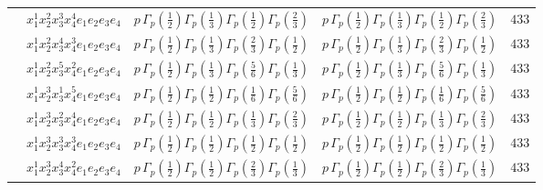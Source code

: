 \documentclass[11pt]{article}
\begin{document}
\begin{table}[ht]
{\begin{tabular}{@{}lllll@{}}
 & $x_{1}^{1} x_{2}^{2} x_{3}^{3} x_{4}^{4}  e_{1} e_{2} e_{3} e_{4}$ & $p \, \Gamma_p \left( \frac{1}{2} \right) \Gamma_p \left( \frac{1}{3} \right) \Gamma_p \left( \frac{1}{2} \right) \Gamma_p \left( \frac{2}{3} \right)$ & $p \, \Gamma_p \left( \frac{1}{2} \right) \Gamma_p \left( \frac{1}{3} \right) \Gamma_p \left( \frac{1}{2} \right) \Gamma_p \left( \frac{2}{3} \right)$ & $433$ \\
 & $x_{1}^{1} x_{2}^{2} x_{3}^{4} x_{4}^{3}  e_{1} e_{2} e_{3} e_{4}$ & $p \, \Gamma_p \left( \frac{1}{2} \right) \Gamma_p \left( \frac{1}{3} \right) \Gamma_p \left( \frac{2}{3} \right) \Gamma_p \left( \frac{1}{2} \right)$ & $p \, \Gamma_p \left( \frac{1}{2} \right) \Gamma_p \left( \frac{1}{3} \right) \Gamma_p \left( \frac{2}{3} \right) \Gamma_p \left( \frac{1}{2} \right)$ & $433$ \\
 & $x_{1}^{1} x_{2}^{2} x_{3}^{5} x_{4}^{2}  e_{1} e_{2} e_{3} e_{4}$ & $p \, \Gamma_p \left( \frac{1}{2} \right) \Gamma_p \left( \frac{1}{3} \right) \Gamma_p \left( \frac{5}{6} \right) \Gamma_p \left( \frac{1}{3} \right)$ & $p \, \Gamma_p \left( \frac{1}{2} \right) \Gamma_p \left( \frac{1}{3} \right) \Gamma_p \left( \frac{5}{6} \right) \Gamma_p \left( \frac{1}{3} \right)$ & $433$ \\
 & $x_{1}^{1} x_{2}^{3} x_{3}^{1} x_{4}^{5}  e_{1} e_{2} e_{3} e_{4}$ & $p \, \Gamma_p \left( \frac{1}{2} \right) \Gamma_p \left( \frac{1}{2} \right) \Gamma_p \left( \frac{1}{6} \right) \Gamma_p \left( \frac{5}{6} \right)$ & $p \, \Gamma_p \left( \frac{1}{2} \right) \Gamma_p \left( \frac{1}{2} \right) \Gamma_p \left( \frac{1}{6} \right) \Gamma_p \left( \frac{5}{6} \right)$ & $433$ \\
 & $x_{1}^{1} x_{2}^{3} x_{3}^{2} x_{4}^{4}  e_{1} e_{2} e_{3} e_{4}$ & $p \, \Gamma_p \left( \frac{1}{2} \right) \Gamma_p \left( \frac{1}{2} \right) \Gamma_p \left( \frac{1}{3} \right) \Gamma_p \left( \frac{2}{3} \right)$ & $p \, \Gamma_p \left( \frac{1}{2} \right) \Gamma_p \left( \frac{1}{2} \right) \Gamma_p \left( \frac{1}{3} \right) \Gamma_p \left( \frac{2}{3} \right)$ & $433$ \\
 & $x_{1}^{1} x_{2}^{3} x_{3}^{3} x_{4}^{3}  e_{1} e_{2} e_{3} e_{4}$ & $p \, \Gamma_p \left( \frac{1}{2} \right) \Gamma_p \left( \frac{1}{2} \right) \Gamma_p \left( \frac{1}{2} \right) \Gamma_p \left( \frac{1}{2} \right)$ & $p \, \Gamma_p \left( \frac{1}{2} \right) \Gamma_p \left( \frac{1}{2} \right) \Gamma_p \left( \frac{1}{2} \right) \Gamma_p \left( \frac{1}{2} \right)$ & $433$ \\
 & $x_{1}^{1} x_{2}^{3} x_{3}^{4} x_{4}^{2}  e_{1} e_{2} e_{3} e_{4}$ & $p \, \Gamma_p \left( \frac{1}{2} \right) \Gamma_p \left( \frac{1}{2} \right) \Gamma_p \left( \frac{2}{3} \right) \Gamma_p \left( \frac{1}{3} \right)$ & $p \, \Gamma_p \left( \frac{1}{2} \right) \Gamma_p \left( \frac{1}{2} \right) \Gamma_p \left( \frac{2}{3} \right) \Gamma_p \left( \frac{1}{3} \right)$ & $433$ \\

\end{tabular}}
\end{table}
\end{document}
